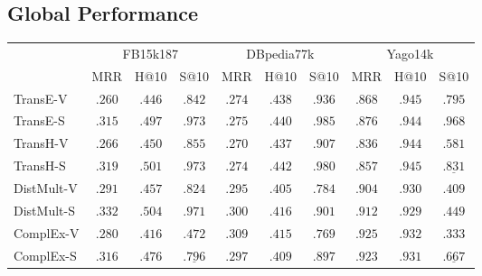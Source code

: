 \documentclass[letterpaper]{article} %
\begin{document}
\subsection{Global Performance}\label{global-perf}
\begin{table*}[h]
        \caption{Rank-based and semantic-based results on the schema-defined knowledge graphs. Bold fonts indicate which model performs best w.r.t. a given metric. Suffixes V and S indicate whether the model is trained under the vanilla or semantic-driven version of the loss function, respectively. Hits@$10$ and Sem@$10$ are abbreviated to H@$10$ and S@$10$. Underlined cells indicate results that are more specifically referred to in Section~\ref{global-perf}.}
	\label{tab:schema-defined-results-compiled}
    \small
	\centering
                \setlength{\tabcolsep}{0.15cm}
			\begin{tabular}{lccccccccc}
                    \hline
				&\multicolumn{3}{c}{FB15k187} & \multicolumn{3}{c}{DBpedia77k} & \multicolumn{3}{c}{Yago14k}
                \\
                    & MRR & H@10 & S@10 &
                    MRR & H@10 & S@10 &
                    MRR & H@10 & S@10 \\
				\hline
				TransE-V &
    $.260$&$.446$&$.842$& $.274$&$.438$&$.936$& $.868$&$\mathbf{.945}$&$.795$\\
                TransE-S &
    $\mathbf{.315}$&$\mathbf{.497}$&$\mathbf{.973}$& $\mathbf{.275}$&$\mathbf{.440}$&$\mathbf{.985}$& $\mathbf{.876}$&$.944$&$\mathbf{.968}$ \\
    \hline
                TransH-V &
    $.266$&$.450$&$.855$& $.270$&$.437$&$.907$& $.836$&$.944$&$.581$ \\
                TransH-S &
    $\mathbf{.319}$&$\mathbf{.501}$&$\mathbf{.973}$& $\mathbf{.274}$&$\mathbf{.442}$&$\mathbf{.980}$& $\mathbf{.857}$&$\mathbf{.945}$&$\underline{\mathbf{.831}}$ \\
    \hline
                DistMult-V &
    $.291$&$.457$&$.824$& $.295$&$.405$&$.784$& $.904$&$\mathbf{.930}$&$.409$ \\
			    DistMult-S &
    $\mathbf{.332}$&$\mathbf{.504}$&$\mathbf{.971}$& $\mathbf{.300}$&$\mathbf{.416}$&$\mathbf{.901}$& $\mathbf{.912}$&$.929$&$\mathbf{.449}$ \\
    \hline
    		ComplEx-V &
    $.280$&$.416$&$.472$& $\mathbf{.309}$&$\mathbf{.415}$&$.769$& $\mathbf{.925}$&$\mathbf{.932}$&$.333$ \\
    		ComplEx-S &
    $\mathbf{.316}$&$\mathbf{.476}$&$\underline{\mathbf{.796}}$& $.297$&$.409$&$\mathbf{.897}$& $.923$&$.931$&$\underline{\mathbf{.667}}$ \\

\end{tabular}
\end{table*}
\end{document}

